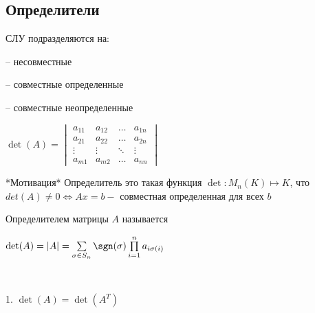 \subsection{Определители}

СЛУ подразделяются на:

-- несовместные

-- совместные определенные

-- совместные неопределенные

$\det(A) = \begin{vmatrix}
    a_{11} & a_{12} & \dots & a_{1n} \\
    a_{21} & a_{22} & \dots & a_{2n} \\
    \vdots & \vdots & \ddots & \vdots \\
    a_{m1} & a_{m2} & \dots & a_{nn}
\end{vmatrix}$

*Мотивация* Определитель это такая функция $\det: M_{n}(K) \mapsto K$, что $det(A) \neq 0 \iff Ax = b - $ совместная определенная для всех $b$

\begin{defn}
    Определителем матрицы $A$ называется 
    
    $\det(A) = |A| = \sum\limits_{\sigma \in S_n} \sgn(\sigma)\prod\limits_{i = 1}^n a_{i\sigma(i)}$
\end{defn}

\begin{prop}~

    1. $\det(A) = \det(A^T)$
\end{prop}